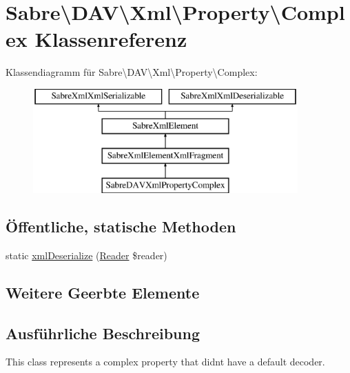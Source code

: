 \hypertarget{class_sabre_1_1_d_a_v_1_1_xml_1_1_property_1_1_complex}{}\section{Sabre\textbackslash{}D\+AV\textbackslash{}Xml\textbackslash{}Property\textbackslash{}Complex Klassenreferenz}
\label{class_sabre_1_1_d_a_v_1_1_xml_1_1_property_1_1_complex}
Klassendiagramm für Sabre\textbackslash{}D\+AV\textbackslash{}Xml\textbackslash{}Property\textbackslash{}Complex\+:\begin{figure}[H]
\begin{center}
\leavevmode
\includegraphics[height=4.000000cm]{class_sabre_1_1_d_a_v_1_1_xml_1_1_property_1_1_complex}
\end{center}
\end{figure}
\subsection*{Öffentliche, statische Methoden}
\begin{DoxyCompactItemize}
\item 
static \mbox{\hyperlink{class_sabre_1_1_d_a_v_1_1_xml_1_1_property_1_1_complex_a6c74a2adbbaaac3558dadde60a473220}{xml\+Deserialize}} (\mbox{\hyperlink{class_sabre_1_1_xml_1_1_reader}{Reader}} \$reader)
\end{DoxyCompactItemize}
\subsection*{Weitere Geerbte Elemente}


\subsection{Ausführliche Beschreibung}
This class represents a \textquotesingle{}complex\textquotesingle{} property that didn\textquotesingle{}t have a default decoder.

